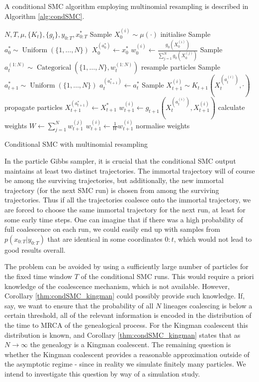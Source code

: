 \documentclass[fleqn]{article}
\newcommand{\Cat}{\operatorname{Categorical}}
\newcommand{\Unif}{\operatorname{Uniform}}
\begin{document}
A conditional SMC algorithm employing multinomial resampling is described in Algorithm \ref{alg:condSMC}.

\begin{algorithm}
\begin{algorithmic}[1]
\Require $N, T, \mu, \{K_t\}, \{g_t\}, y_{0:T}, x_{0:T}^*$
	\State Sample $X_0^{(i)} \sim \mu(\cdot)$ \Comment initialise
\EndFor
\State Sample $a_0^* \sim \Unif(\{1,\dots,N\})$
\State $X_0^{(a_0^*)} \gets x_0^*$
	\State $w_0^{(i)} \gets \frac{g_0(X_0^{(i)})}{\sum_{j=1}^N g_0(X_0^{(j)})}$
\EndFor
{}
	\State Sample $a_t^{(1:N)} \sim \Cat(\{1,\dots,N\}, w_t^{(1:N)})$ \Comment resample particles
	\State Sample $a_{t+1}^* \sim \Unif(\{1,\dots,N\})$
	\State $a_t^{(a_{t+1}^*)} \gets a_t^*$
		\State Sample $X_{t+1}^{(i)} \sim K_{t+1}(X_t^{(a_t^{(i)})}, \cdot)$ \Comment propagate particles
	\EndFor
	\State $X_{t+1}^{(a_{t+1}^*)} \gets X_{t+1}^*$
		\State $w_{t+1}^{(i)} \gets g_{t+1}(X_t^{(a_t^{(i)})} , X_{t+1}^{(i)})$ \Comment calculate weights
	\EndFor
	\State $W \gets \sum_{j=1}^N w_{t+1}^{(j)}$
		\State $w_{t+1}^{(i)} \gets \frac{1}{W}w_{t+1}^{(i)}$ \Comment normalise weights
	\EndFor
\EndFor
\end{algorithmic}
\caption{Conditional SMC with multinomial resampling}
\label{alg:condSMC}
\end{algorithm}

In the particle Gibbs sampler, it is crucial that the conditional SMC output maintains at least two distinct trajectories. 
The immortal trajectory will of course be among the surviving trajectories, but additionally, the new immortal trajectory (for the next SMC run) is chosen from among the surviving trajectories.
Thus if all the trajectories coalesce onto the immortal trajectory, we are forced to choose the same immortal trajectory for the next run, at least for some early time steps.
One can imagine that if there was a high probability of full coalescence on each run, we could easily end up with samples from $p(x_{0:T}|y_{0:T})$ that are identical in some coordinates $0:t$, which would not lead to good results overall.

The problem can be avoided by using a sufficiently large number of particles for the fixed time window $T$ of the conditional SMC runs. This would require a priori knowledge of the coalescence mechanism, which is not available. However, Corollary \ref{thm:condSMC_kingman} could possibly provide such knowledge.
If, say, we want to ensure that the probability of all $N$ lineages coalescing is below a certain threshold, all of the relevant information is encoded in the distribution of the time to MRCA of the genealogical process. For the Kingman coalescent this distribution is known, and Corollary \ref{thm:condSMC_kingman} states that as $N\to\infty$ the genealogy is a Kingman coalescent.
The remaining question is whether the Kingman coalescent provides a reasonable approximation outside of the asymptotic regime - since in reality we simulate finitely many particles. We intend to investigate this question by way of a simulation study.
\end{document}
